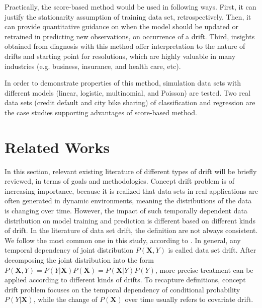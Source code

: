 \documentclass[twoside,11pt]{article}
\begin{document}
Practically, the score-based method would be used in following ways. First, it can justify the stationarity assumption of training data set, retrospectively. Then, it can provide quantitative guidance on when the model should be updated or retrained in predicting new observations, on occurrence of a drift. Third, insights obtained from diagnosis with this method offer interpretation to the nature of drifts and starting point for resolutions, which are highly valuable in many industries (e.g. business, insurance, and health care, etc). 

In order to demonstrate properties of this method, simulation data sets with different models (linear, logistic, multinomial, and Poisson) are tested. Two real data sets (credit default and city bike sharing) of classification and regression are the case studies supporting advantages of score-based method.

\section{Related Works}
In this section, relevant existing literature of different types of drift will be briefly reviewed, in terms of goals and methodologies. Concept drift problem is of increasing importance, because it is realized that data sets in real applications are often generated in dynamic environments, meaning the distributions of the data is changing over time. However, the impact of such temporally dependent data distribution on model training and prediction is different based on different kinds of drift. In the literature  of data set drift, the definition are not always consistent. We follow the most common one in this study, according to \cite{moreno2012unifying,vzliobaite2016overview}. In general, any temporal dependency of joint distribution $P(\bm {X}, Y)$ is called data set drift. After decomposing the joint distribution into the form $P(\bm{X}, Y) = P(Y|\bm{X})P(\bm {X})=P(\bm {X}| {Y})P(Y)$, more precise treatment can be applied according to different kinds of drifts. To recapture definitions, concept drift problem focuses on the temporal dependency of conditional probability $P(Y|\bm{X})$, while the change of $P(\bm{X})$ over time usually refers to covariate drift.
\end{document}
